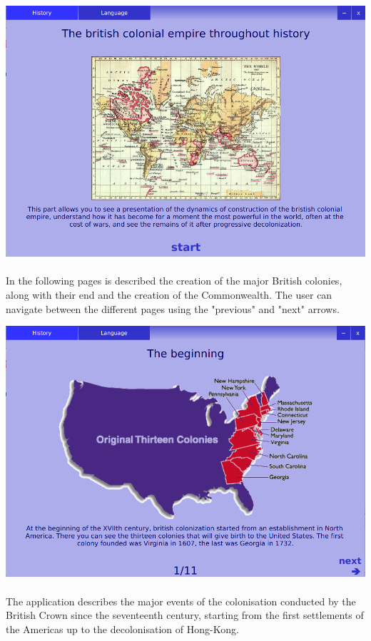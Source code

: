 \documentclass[11pt, a4paper]{report}
\begin{document}
\centerline{\includegraphics[scale=0.4]{images/homeHistory.png}}

\paragraph{}In the following pages is described the creation of the major British colonies, along with their end and the creation of the Commonwealth. The user can navigate between the different pages using the "previous" and "next" arrows.

\vspace{0.3cm}
\centerline{\includegraphics[scale=0.4]{images/firstPage.png}}
\vspace{-0.3cm}

\paragraph{}The application describes the major events of the colonisation conducted by the British Crown since the seventeenth century, starting from the first settlements of the Americas up to the decolonisation of Hong-Kong.
\end{document}
